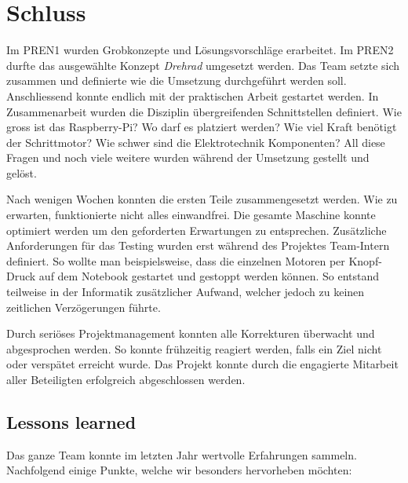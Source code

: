 \section{Schluss}

Im PREN1 wurden Grobkonzepte und Lösungsvorschläge erarbeitet. Im PREN2 durfte das ausgewählte Konzept \textit{Drehrad} umgesetzt werden. Das Team setzte sich zusammen und definierte wie die Umsetzung durchgeführt werden soll. Anschliessend konnte endlich mit der praktischen Arbeit gestartet werden. In Zusammenarbeit wurden die Disziplin übergreifenden Schnittstellen definiert. Wie gross ist das Raspberry-Pi? Wo darf es platziert werden? Wie viel Kraft benötigt der Schrittmotor? Wie schwer sind die Elektrotechnik Komponenten? All diese Fragen und noch viele weitere wurden während der Umsetzung gestellt und gelöst.

Nach wenigen Wochen konnten die ersten Teile zusammengesetzt werden. Wie zu erwarten, funktionierte nicht alles einwandfrei. Die gesamte Maschine konnte optimiert werden um den geforderten Erwartungen zu entsprechen. Zusätzliche Anforderungen für das Testing wurden erst während des Projektes Team-Intern definiert. So wollte man beispielsweise, dass die einzelnen Motoren per Knopf-Druck auf dem Notebook gestartet und gestoppt werden können. So entstand teilweise in der Informatik zusätzlicher Aufwand, welcher jedoch zu keinen zeitlichen Verzögerungen führte.

Durch seriöses Projektmanagement konnten alle Korrekturen überwacht und abgesprochen werden. So konnte frühzeitig reagiert werden, falls ein Ziel nicht oder verspätet erreicht wurde. Das Projekt konnte durch die engagierte Mitarbeit aller Beteiligten erfolgreich abgeschlossen werden.

\subsection{Lessons learned}

Das ganze Team konnte im letzten Jahr wertvolle Erfahrungen sammeln. Nachfolgend einige Punkte, welche wir besonders hervorheben möchten:

